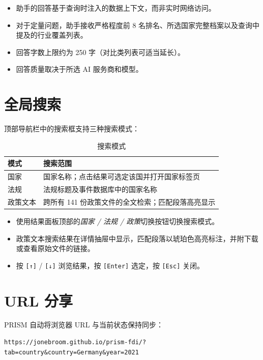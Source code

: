 \documentclass[12pt,a4paper]{article}
\newcommand{\keycap}[1]{%
  \texttt{\footnotesize[#1]}%
}
\newcommand{\uielem}[1]{\textit{#1}}
\begin{document}
\begin{itemize}
  \item 助手的回答基于查询时注入的数据上下文，而非实时网络访问。
  \item 对于定量问题，助手接收严格程度前 8 名排名、所选国家完整档案以及查询中提及的行业覆盖列表。
  \item 回答字数上限约为 250 字（对比类列表可适当延长）。
  \item 回答质量取决于所选 AI 服务商和模型。
\end{itemize}

\section{全局搜索}
\label{sec:search}

顶部导航栏中的搜索框支持三种搜索模式：

\begin{table}[h]
\centering
\begin{tabularx}{\linewidth}{lX}
\toprule
\textbf{模式} & \textbf{搜索范围} \\
\midrule
国家 & 国家名称；点击结果可选定该国并打开国家标签页 \\
法规 & 法规标题及事件数据库中的国家名称 \\
政策文本 & 跨所有 141 份政策文件的全文检索；匹配段落高亮显示 \\
\bottomrule
\end{tabularx}
\caption{搜索模式}
\end{table}

\begin{itemize}
  \item 使用结果面板顶部的\uielem{国家 / 法规 / 政策}切换按钮切换搜索模式。
  \item 政策文本搜索结果在详情抽屉中显示，匹配段落以琥珀色高亮标注，并附下载或查看原始文件的链接。
  \item 按 \keycap{↑}/\keycap{↓} 浏览结果，按 \keycap{Enter} 选定，按 \keycap{Esc} 关闭。
\end{itemize}

\section{URL 分享}
\label{sec:url}

PRISM 自动将浏览器 URL 与当前状态保持同步：

\begin{verbatim}
https://jonebroom.github.io/prism-fdi/?tab=country&country=Germany&year=2021
\end{verbatim}
\end{document}
